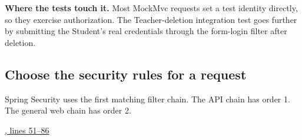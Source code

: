 \textbf{Where the tests touch it.}
Most MockMvc requests set a test identity directly, so they exercise authorization.
The Teacher-deletion integration test goes further by submitting the Student's
real credentials through the form-login filter after deletion.

\clearpage
\subsection{Choose the security rules for a request}
Spring Security uses the first matching filter chain. The API chain has order 1.
The general web chain has order 2.

\par\smallskip
{\small\href{\repo/blob/5d22aed7f6d4ef1e4c0b0c0dabf2962ba4b47608/src/main/java/com/example/fmschool/config/SecurityConfig.java#L51-L86}{, lines 51--86}}
